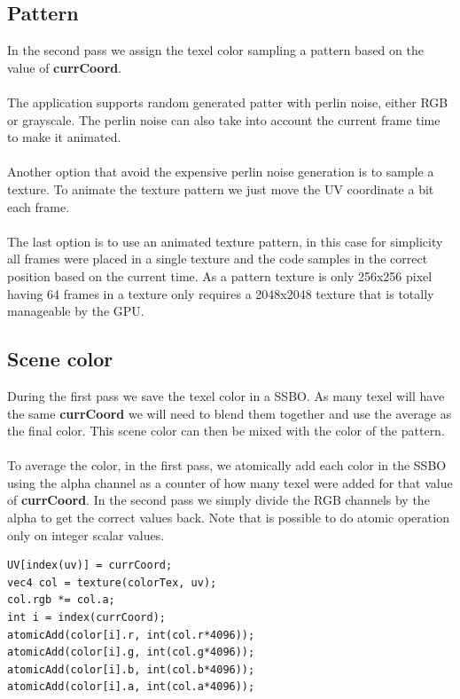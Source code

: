 \documentclass[12pt, a4paper]{article}
\begin{document}
\subsection{Pattern}
In the second pass we assign the texel color sampling a pattern based on the value of \textbf{currCoord}.\\\\
The application supports random generated patter with perlin noise, either RGB or grayscale. The perlin noise
can also take into account the current frame time to make it animated.\\\\
Another option that avoid the expensive perlin noise generation is to sample a texture. To animate the texture pattern
we just move the UV coordinate a bit each frame.\\\\
The last option is to use an animated texture pattern, in this case for simplicity all frames were placed in a single texture
and the code samples in the correct position based on the current time. As a pattern texture is only 256x256 pixel having
64 frames in a texture only requires a 2048x2048 texture that is totally manageable by the GPU.

\subsection{Scene color}
During the first pass we save the texel color in a SSBO. As many texel will have the same \textbf{currCoord} we will
need to blend them together and use the average as the final color. This scene color can then be mixed with the color
of the pattern.\\\\
To average the color, in the first pass, we atomically add each color in the SSBO using the alpha channel as a counter of how many texel
were added for that value of \textbf{currCoord}. In the second pass we simply divide the RGB channels by the alpha to get the correct values back.
Note that is possible to do atomic operation only on integer scalar values.
\begin{lstlisting}[caption={First pass color blending},captionpos=b]
UV[index(uv)] = currCoord;
vec4 col = texture(colorTex, uv);
col.rgb *= col.a;
int i = index(currCoord);
atomicAdd(color[i].r, int(col.r*4096));
atomicAdd(color[i].g, int(col.g*4096));
atomicAdd(color[i].b, int(col.b*4096));
atomicAdd(color[i].a, int(col.a*4096));
\end{lstlisting}
\end{document}

